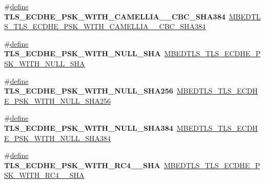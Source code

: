 \begin{DoxyCompactItemize}
\item 
\mbox{\label{compat-1_83_8h_a7c6422e9eb6a4cfcfa184af03f94f386}} 
\#\hyperlink{structdefine}{define} {\bfseries T\+L\+S\+\_\+\+E\+C\+D\+H\+E\+\_\+\+P\+S\+K\+\_\+\+W\+I\+T\+H\+\_\+\+C\+A\+M\+E\+L\+L\+I\+A\+\_\+\_\+\+C\+B\+C\+\_\+\+S\+H\+A384}~\hyperlink{ssl__ciphersuites_8h_ae35802c1a888e90755ee8e644fb15ab0}{M\+B\+E\+D\+T\+L\+S\+\_\+\+T\+L\+S\+\_\+\+E\+C\+D\+H\+E\+\_\+\+P\+S\+K\+\_\+\+W\+I\+T\+H\+\_\+\+C\+A\+M\+E\+L\+L\+I\+A\+\_\+\_\+\+C\+B\+C\+\_\+\+S\+H\+A384}
\item 
\mbox{\label{compat-1_83_8h_a8538f96aa91dc0c224b0d05b1836b9cb}} 
\#\hyperlink{structdefine}{define} {\bfseries T\+L\+S\+\_\+\+E\+C\+D\+H\+E\+\_\+\+P\+S\+K\+\_\+\+W\+I\+T\+H\+\_\+\+N\+U\+L\+L\+\_\+\+S\+HA}~\hyperlink{ssl__ciphersuites_8h_a25faf3187de6a46f6acdc655d7c94a8f}{M\+B\+E\+D\+T\+L\+S\+\_\+\+T\+L\+S\+\_\+\+E\+C\+D\+H\+E\+\_\+\+P\+S\+K\+\_\+\+W\+I\+T\+H\+\_\+\+N\+U\+L\+L\+\_\+\+S\+HA}
\item 
\mbox{\label{compat-1_83_8h_a3354aef4f250db8e5bdd6a6d5895df6c}} 
\#\hyperlink{structdefine}{define} {\bfseries T\+L\+S\+\_\+\+E\+C\+D\+H\+E\+\_\+\+P\+S\+K\+\_\+\+W\+I\+T\+H\+\_\+\+N\+U\+L\+L\+\_\+\+S\+H\+A256}~\hyperlink{ssl__ciphersuites_8h_ac701c727d1c9f4bab4c07a4faa712d48}{M\+B\+E\+D\+T\+L\+S\+\_\+\+T\+L\+S\+\_\+\+E\+C\+D\+H\+E\+\_\+\+P\+S\+K\+\_\+\+W\+I\+T\+H\+\_\+\+N\+U\+L\+L\+\_\+\+S\+H\+A256}
\item 
\mbox{\label{compat-1_83_8h_a02eef432c766622e852a0e5ffbc36d3c}} 
\#\hyperlink{structdefine}{define} {\bfseries T\+L\+S\+\_\+\+E\+C\+D\+H\+E\+\_\+\+P\+S\+K\+\_\+\+W\+I\+T\+H\+\_\+\+N\+U\+L\+L\+\_\+\+S\+H\+A384}~\hyperlink{ssl__ciphersuites_8h_a101125135f27cb15a59db289ec1a9705}{M\+B\+E\+D\+T\+L\+S\+\_\+\+T\+L\+S\+\_\+\+E\+C\+D\+H\+E\+\_\+\+P\+S\+K\+\_\+\+W\+I\+T\+H\+\_\+\+N\+U\+L\+L\+\_\+\+S\+H\+A384}
\item 
\mbox{\label{compat-1_83_8h_a7d019962fe8f70ddc729687a7e0ccdb9}} 
\#\hyperlink{structdefine}{define} {\bfseries T\+L\+S\+\_\+\+E\+C\+D\+H\+E\+\_\+\+P\+S\+K\+\_\+\+W\+I\+T\+H\+\_\+\+R\+C4\+\_\+\_\+\+S\+HA}~\hyperlink{ssl__ciphersuites_8h_a1dcf92a298581fa05208a0dbd34bb2fb}{M\+B\+E\+D\+T\+L\+S\+\_\+\+T\+L\+S\+\_\+\+E\+C\+D\+H\+E\+\_\+\+P\+S\+K\+\_\+\+W\+I\+T\+H\+\_\+\+R\+C4\+\_\+\_\+\+S\+HA}

\end{DoxyCompactItemize}

